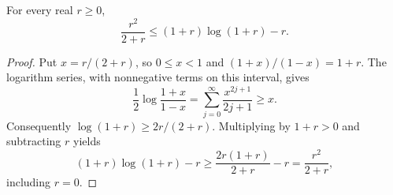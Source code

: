 \begin{lemma}
For every real $r\ge0$,
\[
\frac{r^2}{2+r}\le (1+r)\log(1+r)-r.
\]
\end{lemma}
\begin{proof}
Put $x=r/(2+r)$, so $0\le x<1$ and
$(1+x)/(1-x)=1+r$. The logarithm series, with nonnegative
terms on this interval, gives
\[
\frac12\log\frac{1+x}{1-x}
=\sum_{j=0}^{\infty}\frac{x^{2j+1}}{2j+1}\ge x.
\]
Consequently $\log(1+r)\ge2r/(2+r)$. Multiplying by
$1+r>0$ and subtracting $r$ yields
\[
(1+r)\log(1+r)-r\ge
\frac{2r(1+r)}{2+r}-r=\frac{r^2}{2+r},
\]
including $r=0$.
\end{proof}
